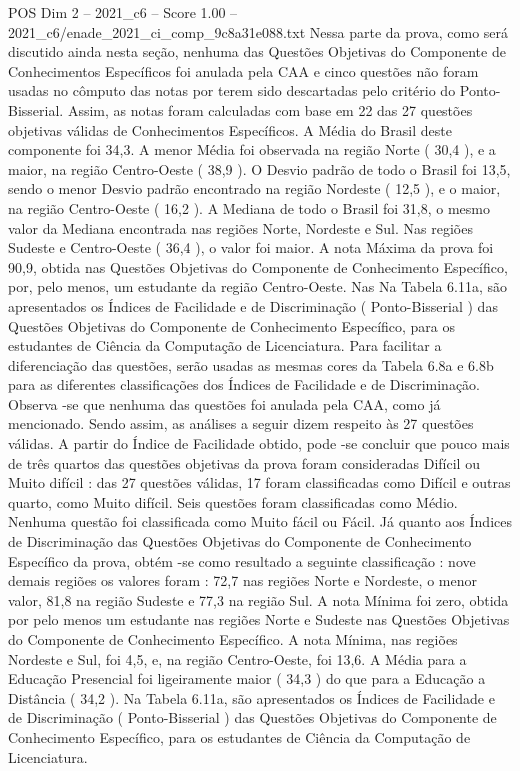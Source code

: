 \begin{textsample}{POS Dim 2 – 2021\_c6 – Score 1.00 – 2021\_c6/enade\_2021\_ci\_comp\_9c8a31e088.txt}
Nessa parte da prova, como será discutido ainda nesta seção, nenhuma das Questões Objetivas do Componente de Conhecimentos Específicos foi anulada pela CAA e cinco questões não foram usadas no cômputo das notas por terem sido descartadas pelo critério do Ponto-Bisserial.
Assim, as notas foram calculadas com base em 22 das 27 questões objetivas válidas de Conhecimentos Específicos.
A Média do Brasil deste componente foi 34,3.
A menor Média foi observada na região Norte ( 30,4 ), e a maior, na região Centro-Oeste ( 38,9 ).
O Desvio padrão de todo o Brasil foi 13,5, sendo o menor Desvio padrão encontrado na região Nordeste ( 12,5 ), e o maior, na região Centro-Oeste ( 16,2 ).
A Mediana de todo o Brasil foi 31,8, o mesmo valor da Mediana encontrada nas regiões Norte, Nordeste e Sul.
Nas regiões Sudeste e Centro-Oeste ( 36,4 ), o valor foi maior.
A nota Máxima da prova foi 90,9, obtida nas Questões Objetivas do Componente de Conhecimento Específico, por, pelo menos, um estudante da região Centro-Oeste.
Nas Na Tabela 6.11a, são apresentados os Índices de Facilidade e de Discriminação ( Ponto-Bisserial ) das Questões Objetivas do Componente de Conhecimento Específico, para os estudantes de Ciência da Computação de Licenciatura.
Para facilitar a diferenciação das questões, serão usadas as mesmas cores da Tabela 6.8a e 6.8b para as diferentes classificações dos Índices de Facilidade e de Discriminação.
Observa -se que nenhuma das questões foi anulada pela CAA, como já mencionado.
Sendo assim, as análises a seguir dizem respeito às 27 questões válidas.
A partir do Índice de Facilidade obtido, pode -se concluir que pouco mais de três quartos das questões objetivas da prova foram consideradas Difícil ou Muito difícil : das 27 questões válidas, 17 foram classificadas como Difícil e outras quarto, como Muito difícil.
Seis questões foram classificadas como Médio.
Nenhuma questão foi classificada como Muito fácil ou Fácil.
Já quanto aos Índices de Discriminação das Questões Objetivas do Componente de Conhecimento Específico da prova, obtém -se como resultado a seguinte classificação : nove demais regiões os valores foram : 72,7 nas regiões Norte e Nordeste, o menor valor, 81,8 na região Sudeste e 77,3 na região Sul.
A nota Mínima foi zero, obtida por pelo menos um estudante nas regiões Norte e Sudeste nas Questões Objetivas do Componente de Conhecimento Específico.
A nota Mínima, nas regiões Nordeste e Sul, foi 4,5, e, na região Centro-Oeste, foi 13,6.
A Média para a Educação Presencial foi ligeiramente maior ( 34,3 ) do que para a Educação a Distância ( 34,2 ).
Na Tabela 6.11a, são apresentados os Índices de Facilidade e de Discriminação ( Ponto-Bisserial ) das Questões Objetivas do Componente de Conhecimento Específico, para os estudantes de Ciência da Computação de Licenciatura.

\end{textsample}
